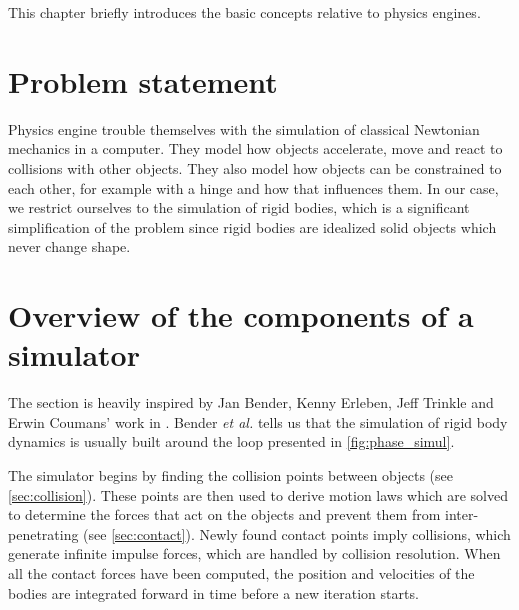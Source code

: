 This chapter briefly introduces the basic concepts relative to physics engines.

\section{Problem statement}
Physics engine trouble themselves with the simulation of classical Newtonian mechanics in a computer. They model how objects accelerate, move and react to collisions with other objects. They also model how objects can be constrained to each other, for example with a hinge and how that influences them. In our case, we restrict ourselves to the simulation of rigid bodies, which is a significant simplification of the problem since rigid bodies are idealized solid objects which never change shape.


\section{Overview of the components of a simulator}
The section is heavily inspired by Jan Bender, Kenny Erleben, Jeff Trinkle and Erwin Coumans' work in \cite{BETC2012}. Bender \emph{et al.} \cite{BETC2012} tells us that the simulation of rigid body dynamics is usually built around the loop presented in \cref{fig:phase_simul}. 

The simulator begins by finding the collision points between objects (see \cref{sec:collision}). These points are then used to derive motion laws which are solved to determine the forces that act on the objects and prevent them from inter-penetrating (see \cref{sec:contact}). Newly found contact points imply collisions, which generate infinite impulse forces, which are handled by collision resolution. When all the contact forces have been computed, the position and velocities of the bodies are integrated forward in time before a new iteration starts.


